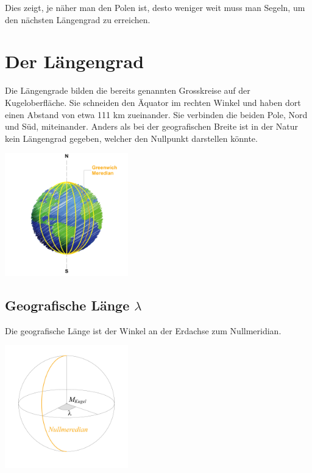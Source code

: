 \begin{refsection}
Dies zeigt, je näher man den Polen ist, desto weniger weit muss man Segeln, um den nächsten Längengrad zu erreichen.



\section{Der Längengrad}
Die Längengrade bilden die bereits genannten Grosskreise auf der Kugeloberfläche.
Sie schneiden den Äquator im rechten Winkel und haben dort einen Abstand von etwa 111 km zueinander. Sie verbinden die beiden Pole, Nord und Süd, miteinander. Anders als bei der geografischen Breite ist in der Natur kein Längengrad gegeben, welcher den Nullpunkt darstellen könnte.

\begin{center}
        \includegraphics[width=0.4\textwidth]{kugel/Laengengrad.jpg}
\end{center}


\subsection{Geografische Länge $\lambda$}
\begin{definition}
Die geografische Länge ist der Winkel an der Erdachse zum Nullmeridian.
\end{definition}

\begin{center}
        \includegraphics[width=0.4\textwidth]{kugel/GeografischeLaenge.jpg}
\end{center}


\end{refsection}
